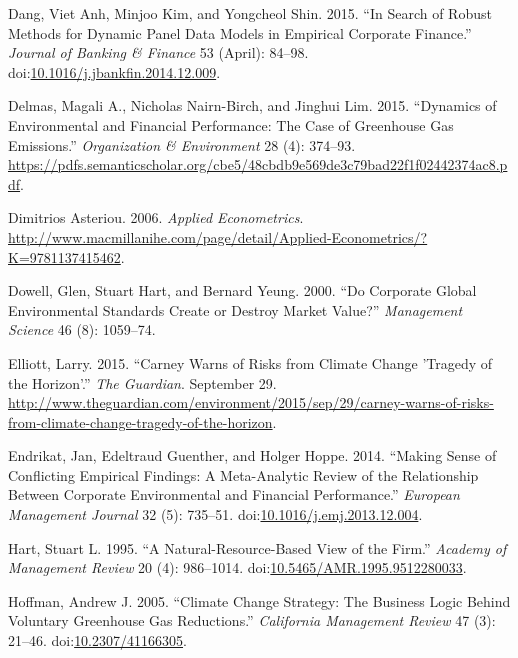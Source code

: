 \documentclass[12pt,]{article}
\begin{document}
\hypertarget{ref-Dangsearchrobustmethods2015}{}
Dang, Viet Anh, Minjoo Kim, and Yongcheol Shin. 2015. ``In Search of
Robust Methods for Dynamic Panel Data Models in Empirical Corporate
Finance.'' \emph{Journal of Banking \& Finance} 53 (April): 84--98.
doi:\href{https://doi.org/10.1016/j.jbankfin.2014.12.009}{10.1016/j.jbankfin.2014.12.009}.

\hypertarget{ref-Delmas2015}{}
Delmas, Magali A., Nicholas Nairn-Birch, and Jinghui Lim. 2015.
``Dynamics of Environmental and Financial Performance: The Case of
Greenhouse Gas Emissions.'' \emph{Organization \& Environment} 28 (4):
374--93.
\url{https://pdfs.semanticscholar.org/cbe5/48cbdb9e569de3c79bad22f1f02442374ac8.pdf}.

\hypertarget{ref-DimitriosAsteriou2006}{}
Dimitrios Asteriou. 2006. \emph{Applied Econometrics}.
\url{http://www.macmillanihe.com/page/detail/Applied-Econometrics/?K=9781137415462}.

\hypertarget{ref-Dowell2000}{}
Dowell, Glen, Stuart Hart, and Bernard Yeung. 2000. ``Do Corporate
Global Environmental Standards Create or Destroy Market Value?''
\emph{Management Science} 46 (8): 1059--74.

\hypertarget{ref-Elliott2015}{}
Elliott, Larry. 2015. ``Carney Warns of Risks from Climate Change
'Tragedy of the Horizon'.'' \emph{The Guardian}. September 29.
\url{http://www.theguardian.com/environment/2015/sep/29/carney-warns-of-risks-from-climate-change-tragedy-of-the-horizon}.

\hypertarget{ref-EndrikatMakingsenseconflicting2014}{}
Endrikat, Jan, Edeltraud Guenther, and Holger Hoppe. 2014. ``Making
Sense of Conflicting Empirical Findings: A Meta-Analytic Review of the
Relationship Between Corporate Environmental and Financial
Performance.'' \emph{European Management Journal} 32 (5): 735--51.
doi:\href{https://doi.org/10.1016/j.emj.2013.12.004}{10.1016/j.emj.2013.12.004}.

\hypertarget{ref-HartNaturalResourceBasedViewFirm1995}{}
Hart, Stuart L. 1995. ``A Natural-Resource-Based View of the Firm.''
\emph{Academy of Management Review} 20 (4): 986--1014.
doi:\href{https://doi.org/10.5465/AMR.1995.9512280033}{10.5465/AMR.1995.9512280033}.

\hypertarget{ref-HoffmanClimateChangeStrategy2005}{}
Hoffman, Andrew J. 2005. ``Climate Change Strategy: The Business Logic
Behind Voluntary Greenhouse Gas Reductions.'' \emph{California
Management Review} 47 (3): 21--46.
doi:\href{https://doi.org/10.2307/41166305}{10.2307/41166305}.
\end{document}
